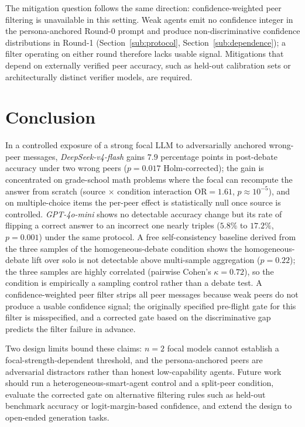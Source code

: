 \documentclass[review,3p,authoryear]{elsarticle}
\begin{document}
The mitigation question follows the same direction: confidence-weighted
peer filtering is unavailable in this setting.
Weak agents emit no confidence integer in the persona-anchored Round-0
prompt and produce non-discriminative confidence distributions in
Round-1 (Section~\ref{sub:protocol}, Section~\ref{sub:dependence}); a
filter operating on either round therefore lacks usable signal.
Mitigations that depend on externally verified peer accuracy, such as
held-out calibration sets or architecturally distinct verifier
models, are required.

\section{Conclusion}
\label{sec:conclusion}

In a controlled exposure of a strong focal LLM to adversarially
anchored wrong-peer messages, \textit{DeepSeek-v4-flash} gains
$7.9$ percentage points in post-debate accuracy under two wrong
peers ($p = 0.017$ Holm-corrected); the gain is concentrated on
grade-school math problems where the focal can recompute the answer
from scratch (source $\times$ condition interaction
$\mathrm{OR} = 1.61$, $p \approx 10^{-5}$), and on multiple-choice
items the per-peer effect is statistically null once source is
controlled.
\textit{GPT-4o-mini} shows no detectable accuracy change but its
rate of flipping a correct answer to an incorrect one nearly triples
($5.8\%$ to $17.2\%$, $p = 0.001$) under the same protocol.
A free self-consistency baseline derived from the three samples of
the homogeneous-debate condition shows the homogeneous-debate lift
over solo is not detectable above multi-sample aggregation
($p = 0.22$); the three samples are highly correlated (pairwise
Cohen's $\kappa = 0.72$), so the condition is empirically a
sampling control rather than a debate test.
A confidence-weighted peer filter strips all peer messages because
weak peers do not produce a usable confidence signal; the originally
specified pre-flight gate for this filter is misspecified, and a
corrected gate based on the discriminative gap predicts the filter
failure in advance.

Two design limits bound these claims: $n = 2$ focal models cannot
establish a focal-strength-dependent threshold, and the
persona-anchored peers are adversarial distractors rather than
honest low-capability agents.
Future work should run a heterogeneous-smart-agent control and a
split-peer condition, evaluate the corrected gate on alternative
filtering rules such as held-out benchmark accuracy or
logit-margin-based confidence, and extend the design to open-ended
generation tasks.
\end{document}
